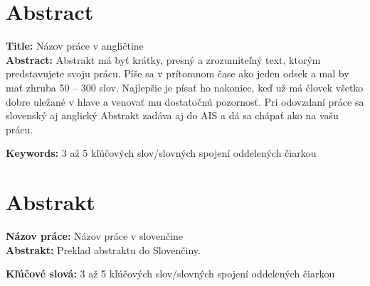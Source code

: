 
\section*{Abstract}
\noindent \textbf{Title:} Názov práce v angličtine\\
\textbf{Abstract:} Abstrakt má byť krátky, presný a zrozumiteľný text, ktorým predstavujete svoju prácu. Píše sa v prítomnom čase ako jeden odsek a mal by mať zhruba 50 -- 300 slov. Najlepšie je písať ho nakoniec, keď už má človek všetko dobre uležané v hlave a venovať mu dostatočnú pozornosť. Pri odovzdaní práce sa slovenský aj anglický Abstrakt zadáva aj do AIS a dá sa chápať ako  na vašu prácu.

\vspace{10pt}

\noindent \textbf{Keywords:} 3 až 5 kľúčových slov/slovných spojení oddelených čiarkou

\vspace{+20pt}


\section*{Abstrakt}

\noindent \textbf{Názov práce:} Názov práce v slovenčine\\
\textbf{Abstrakt:} Preklad abstraktu do Slovenčiny.

\vspace{10pt}

\noindent \textbf{Kľúčové slová:} 3 až 5 kľúčových slov/slovných spojení oddelených čiarkou
